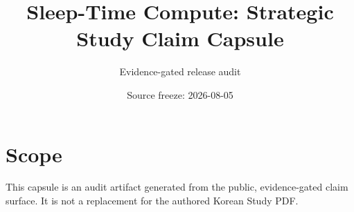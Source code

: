 \documentclass{article}
\title{Sleep-Time Compute: Strategic Study Claim Capsule}
\author{Evidence-gated release audit}
\date{Source freeze: 2026-08-05}
\begin{document}
\maketitle
\section{Scope}
This capsule is an audit artifact generated from the public, evidence-gated
claim surface. It is not a replacement for the authored Korean Study PDF.
\end{document}
